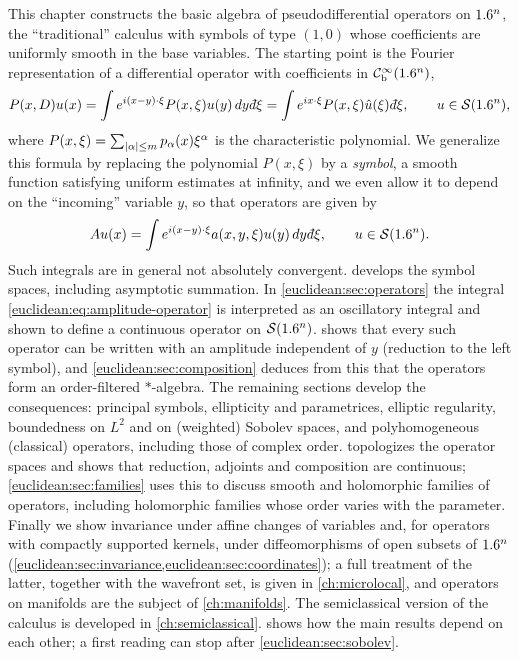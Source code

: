 This chapter constructs the basic algebra of pseudodifferential operators on
$1.6^n$, the ``traditional'' calculus with symbols of type $(1,0)$ whose
coefficients are uniformly smooth in the base variables. The starting point is
the Fourier representation of a differential operator with coefficients in
$\mathcal{C}^\infty_{\mathrm{b}}(1.6^n)$,
\begin{equation*}
  P(x,D)u(x)=\int e^{i(x-y)\cdot\xi}P(x,\xi)u(y)\,dy\,\dbar\xi
  =\int e^{ix\cdot\xi}P(x,\xi)\hat u(\xi)\,\dbar\xi,\qquad u\in\cS(\R^n),
\end{equation*}
where $P(x,\xi)=\sum_{\lvert \alpha\rvert\le m}p_\alpha(x)\xi^\alpha$ is the
characteristic polynomial. We generalize this formula by replacing the
polynomial $P(x,\xi)$ by a \emph{symbol}, a smooth function satisfying
uniform estimates at infinity, and we even allow it to depend on the
``incoming'' variable $y$, so that operators are given by
\begin{equation}\label{euclidean:eq:amplitude-operator}
  Au(x)=\int e^{i(x-y)\cdot\xi}a(x,y,\xi)u(y)\,dy\,\dbar\xi,\qquad u\in\cS(\R^n).
\end{equation}
Such integrals are in general not absolutely convergent.
 develops the symbol spaces, including
asymptotic summation. In \cref{euclidean:sec:operators} the integral
\eqref{euclidean:eq:amplitude-operator} is interpreted as an oscillatory
integral and shown to define a continuous operator on $\mathcal{S}(1.6^n)$.
 shows that every such operator can be written
with an amplitude independent of $y$ (reduction to the left symbol), and
\cref{euclidean:sec:composition} deduces from this that the operators form
an order-filtered $*$-algebra. The remaining sections develop the
consequences: principal symbols, ellipticity and parametrices, elliptic
regularity, boundedness on $L^2$ and on (weighted) Sobolev spaces, and
polyhomogeneous (classical) operators, including those of complex order.
 topologizes the operator spaces and shows that
reduction, adjoints and composition are continuous;
\cref{euclidean:sec:families} uses this to discuss smooth and holomorphic
families of operators, including holomorphic families whose order varies
with the parameter. Finally we show invariance under affine changes of
variables and, for operators with compactly supported kernels, under
diffeomorphisms of open subsets of $1.6^n$
(\cref{euclidean:sec:invariance,euclidean:sec:coordinates}); a full
treatment of the latter, together with the wavefront set, is given in
\cref{ch:microlocal}, and operators on manifolds are the subject of
\cref{ch:manifolds}. The semiclassical version of the calculus is developed
in \cref{ch:semiclassical}.  shows how the main results
depend on each other; a first reading can stop after \cref{euclidean:sec:sobolev}.

